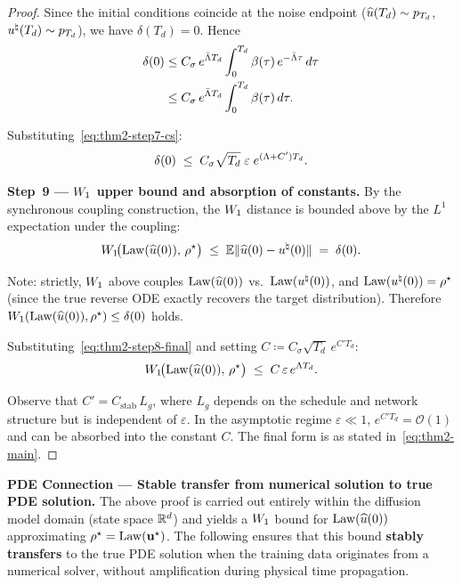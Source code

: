 \begin{proof}
Since the initial conditions coincide at the noise endpoint ($\widehat{u}(T_{d}) \sim p_{T_{d}}$, $u^{\natural}(T_{d}) \sim p_{T_{d}}$), we have $\delta(T_{d}) = 0$. Hence
\begin{align}
\delta(0)
&\le C_{\sigma}\,e^{\bar{\Lambda} T_{d}} \int_{0}^{T_{d}} \beta(\tau)\,e^{-\bar{\Lambda} \tau}\,d\tau \notag \\
&\le C_{\sigma}\,e^{\bar{\Lambda} T_{d}} \int_{0}^{T_{d}} \beta(\tau)\,d\tau.
\label{eq:thm2-step8-delta0}
\end{align}

Substituting~\eqref{eq:thm2-step7-cs}:
\begin{equation}
\delta(0) \;\le\; C_{\sigma} \sqrt{T_{d}}\;\varepsilon\;e^{(\Lambda + C')T_{d}}.
\label{eq:thm2-step8-final}
\end{equation}

\medskip
\noindent
\textbf{Step~9 --- $W_{1}$ upper bound and absorption of constants.}
By the synchronous coupling construction, the $W_{1}$ distance is bounded above by the $L^{1}$ expectation under the coupling:
\begin{equation}
W_{1}\!\bigl(\mathrm{Law}(\widehat{u}(0)),\, \rho^{\star}\bigr)
\;\le\; \mathbb{E}\lVert \widehat{u}(0) - u^{\natural}(0) \rVert
\;=\; \delta(0).
\label{eq:thm2-step9-W1}
\end{equation}

Note: strictly, $W_{1}$ above couples $\mathrm{Law}(\widehat{u}(0))$ vs.\ $\mathrm{Law}(u^{\natural}(0))$, and $\mathrm{Law}(u^{\natural}(0)) = \rho^{\star}$ (since the true reverse ODE exactly recovers the target distribution). Therefore $W_{1}(\mathrm{Law}(\widehat{u}(0)), \rho^{\star}) \le \delta(0)$ holds.

Substituting~\eqref{eq:thm2-step8-final} and setting $C \coloneqq C_{\sigma} \sqrt{T_{d}}\,e^{C' T_{d}}$:
\begin{equation}
W_{1}\!\bigl(\mathrm{Law}(\widehat{u}(0)),\, \rho^{\star}\bigr)
\;\le\; C\,\varepsilon\,e^{\Lambda T_{d}}.
\label{eq:thm2-step9-final}
\end{equation}

Observe that $C' = C_{\mathrm{stab}}\,L_{g}$, where $L_{g}$ depends on the schedule and network structure but is independent of $\varepsilon$. In the asymptotic regime $\varepsilon \ll 1$, $e^{C'T_{d}} = \mathcal{O}(1)$ and can be absorbed into the constant $C$. The final form is as stated in~\eqref{eq:thm2-main}.
\end{proof}

\medskip
\noindent
\textbf{PDE Connection --- Stable transfer from numerical solution to true PDE solution.}
The above proof is carried out entirely within the diffusion model domain (state space $\mathbb{R}^{d}$) and yields a $W_{1}$ bound for $\mathrm{Law}(\widehat{u}(0))$ approximating $\rho^{\star} = \mathrm{Law}(\mathbf{u}^{\star})$. The following ensures that this bound \textbf{stably transfers} to the true PDE solution when the training data originates from a numerical solver, without amplification during physical time propagation.

